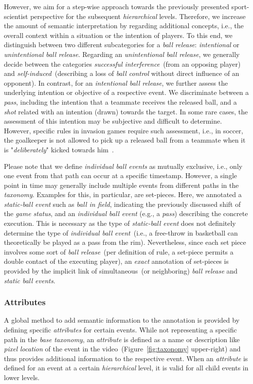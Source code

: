 However, we aim for a step-wise approach towards the previously presented sport-scientist perspective for the subsequent \textit{hierarchical} levels.
Therefore, we increase the amount of semantic interpretation by regarding additional concepts, i.e., the overall context within a situation or the intention of players.
To this end, we distinguish between two different subcategories for a \textit{ball release}: \textit{intentional} or \textit{unintentional ball release}.
Regarding an \textit{unintentional ball release}, we generally decide between the categories \textit{successful interference}~(from an opposing player) and \textit{self-induced}~(describing a loss of \textit{ball control} without direct influence of an opponent).
\newpage
In contrast, for an \textit{intentional ball release}, we further assess the underlying intention or objective of a respective event. We discriminate between a \textit{pass}, including the intention that a teammate receives the released ball, and a \textit{shot} related with an intention (drawn) towards the target. 
In some rare cases, the assessment of this intention may be subjective and difficult to determine. However, specific rules in invasion games require such assessment, i.e., in soccer, the goalkeeper is not allowed to pick up a released ball from a teammate when it is "\emph{deliberately}" kicked towards him~\cite{IFAB}.

Please note that we define \textit{individual ball events} as mutually exclusive, i.e., only one event from that path can occur at a specific timestamp. However, a single point in time may generally include multiple events from different paths in the \textit{taxonomy}. 
Examples for this, in particular, are set-pieces. Here, we annotated a \textit{static-ball event} such as \emph{ball in field}, indicating the previously discussed shift of the \textit{game status}, and an \textit{individual ball event} (e.g., a \textit{pass}) describing the concrete execution. This is necessary as the type of \textit{static-ball event} does not definitely determine the type of \textit{individual ball event}~(i.e., a free-throw in basketball can theoretically be played as a pass from the rim). Nevertheless, since each set piece involves some sort of \textit{ball release}~(per definition of rule, a set-piece permits a double contact of the executing player), an \textit{exact} annotation of set-pieces is provided by the implicit link of simultaneous~(or neighboring) \textit{ball release} and \textit{static ball events}.

\subsubsection{Attributes}
A global method to add semantic information to the annotation is provided by defining specific \textit{attributes} for certain events. 
While not representing a specific path in the \textit{base taxonomy}, an \textit{attribute} is defined as a name or description like \emph{pixel location} of the event in the video~(Figure~\ref{fig:taxonomy} upper-right) and thus provides additional information to the respective event.
When an \textit{attribute} is defined for an event at a certain \textit{hierarchical} level, it is valid for all child events in lower levels.

